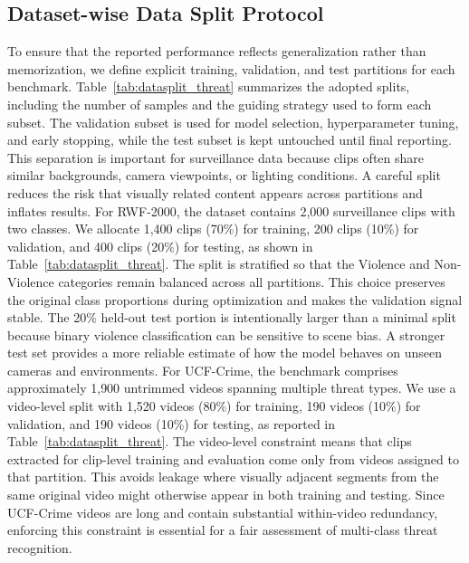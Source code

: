 \documentclass[AMA,Times1COL]{WileyNJDv5} %
\begin{document}
\subsection{Dataset-wise Data Split Protocol}
To ensure that the reported performance reflects generalization rather than memorization, we define explicit training, validation, and test partitions for each benchmark. Table~\ref{tab:datasplit_threat} summarizes the adopted splits, including the number of samples and the guiding strategy used to form each subset. The validation subset is used for model selection, hyperparameter tuning, and early stopping, while the test subset is kept untouched until final reporting. This separation is important for surveillance data because clips often share similar backgrounds, camera viewpoints, or lighting conditions. A careful split reduces the risk that visually related content appears across partitions and inflates results. For RWF-2000, the dataset contains 2{,}000 surveillance clips with two classes. We allocate 1{,}400 clips (70\%) for training, 200 clips (10\%) for validation, and 400 clips (20\%) for testing, as shown in Table~\ref{tab:datasplit_threat}. The split is stratified so that the Violence and Non-Violence categories remain balanced across all partitions. This choice preserves the original class proportions during optimization and makes the validation signal stable. The 20\% held-out test portion is intentionally larger than a minimal split because binary violence classification can be sensitive to scene bias. A stronger test set provides a more reliable estimate of how the model behaves on unseen cameras and environments. For UCF-Crime, the benchmark comprises approximately 1{,}900 untrimmed videos spanning multiple threat types. We use a video-level split with 1{,}520 videos (80\%) for training, 190 videos (10\%) for validation, and 190 videos (10\%) for testing, as reported in Table~\ref{tab:datasplit_threat}. The video-level constraint means that clips extracted for clip-level training and evaluation come only from videos assigned to that partition. This avoids leakage where visually adjacent segments from the same original video might otherwise appear in both training and testing. Since UCF-Crime videos are long and contain substantial within-video redundancy, enforcing this constraint is essential for a fair assessment of multi-class threat recognition.
\end{document}

